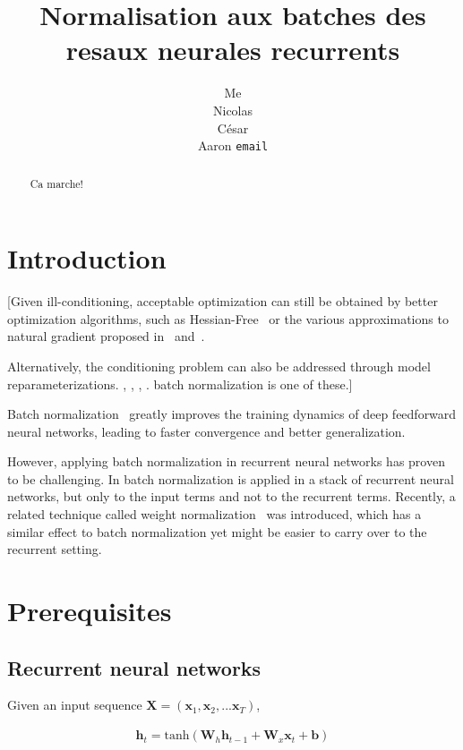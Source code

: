 \documentclass{article} %
\title{Normalisation aux batches des resaux neurales recurrents}
\author{
Me \\
\And
Nicolas \\
\And
C\'esar \\
\And
Aaron
\texttt{email} \\
}
\newcommand{\vect}[1]{\mathbf{#1}}
\newcommand{\mat}[1]{\mathbf{#1}}
\begin{document}
\maketitle

\begin{abstract}
\,Ca marche!
\end{abstract}

\section{Introduction}

[Given ill-conditioning, acceptable optimization can still be obtained by better optimization algorithms, such as
Hessian-Free~\cite{hessianfree} or the various approximations to natural gradient proposed in~\cite{ollivier} and~\cite{KFAC}.

Alternatively, the conditioning problem can also be addressed through model reparameterizations.
\cite{lecun}, \cite{raiko}, \cite{pascanu}, \cite{desjardins}.
batch normalization is one of these.]

Batch normalization~\cite{ioffe2015batch} greatly improves the training dynamics of deep feedforward neural networks, leading to faster convergence and better generalization.

However, applying batch normalization in recurrent neural networks has proven to be challenging.
In \cite{Baidu} batch normalization is applied in a stack of recurrent neural networks, but only to the input terms and not to the recurrent terms.
\cite{Cesar} 
Recently, a related technique called weight normalization~\cite{salimans2016weight} was introduced, which has a similar effect to batch normalization yet might be easier to carry over to the recurrent setting.

\section{Prerequisites}
\subsection{Recurrent neural networks}

Given an input sequence $\mat{X} = ( \vect{x}_1, \vect{x}_2, ... \vect{x}_T )$,

\begin{align}
\vect{h}_t = \mathrm{tanh}(
  \mat{W}_h \vect{h}_{t-1} +
  \mat{W}_x \vect{x}_t +
  \vect{b})
\end{align}
\end{document}
